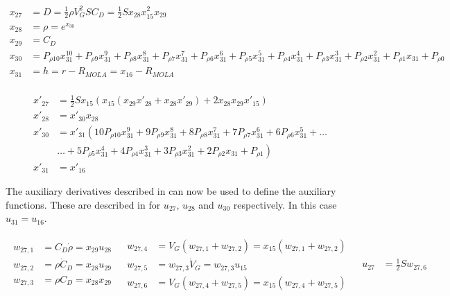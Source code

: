  \begin{equation} \label{eq:dragAux}
\begin{split}
x_{27} &= D = \frac{1}{2}\rho V_{G}^{2}SC_{D} = \frac{1}{2}Sx_{28}x_{15}^{2}x_{29}\\
x_{28} &= \rho = e^{x_{30}} \\
x_{29} &= C_{D} \\
x_{30} &= P_{\rho 10}x_{31}^{10}+P_{\rho 9}x_{31}^{9}+P_{\rho 8}x_{31}^{8}+P_{\rho 7}x_{31}^{7}+P_{\rho 6}x_{31}^{6}+P_{\rho 5}x_{31}^{5}+P_{\rho 4}x_{31}^{4}+P_{\rho 3}x_{31}^{3}+P_{\rho 2}x_{31}^{2}+P_{\rho 1}x_{31}+P_{\rho 0} \\
x_{31} &= h = r-R_{MOLA} = x_{16}-R_{MOLA} \\
\end{split}
\end{equation}

 \begin{equation} \label{eq:dragDerAux}
\begin{split}
x'_{27} &= \frac{1}{2}Sx_{15}\left(x_{15} \left(x_{29}x'_{28}+x_{28}x'_{29}\right)+2x_{28}x_{29}x'_{15}\right) \\
x'_{28} &= x'_{30}x_{28} \\
x'_{30} &=x'_{31} \left(10 P_{\rho 10}x_{31}^{9}+9 P_{\rho 9}x_{31}^{8}+8 P_{\rho 8}x_{31}^{7}+7 P_{\rho 7}x_{31}^{6}+6 P_{\rho 6}x_{31}^{5}+\dots \right. \\
&  \left. \dotsc +5 P_{\rho 5}x_{31}^{4}+4 P_{\rho 4}x_{31}^{3}+3 P_{\rho 3}x_{31}^{2}+2 P_{\rho 2}x_{31}+P_{\rho 1}\right) \\
x'_{31} &= x'_{16}
\end{split}
\end{equation}

\noindent
The auxiliary derivatives described in  can now be used to define the auxiliary functions. These are described in  for $u_{27}$, $u_{28}$ and $u_{30}$ respectively. In this case $u_{31}=u_{16}$.

\begin{align} \label{eq:u27}
\begin{split}
w_{27,1} &= C_{D}\dot{\rho} = x_{29}u_{28} \\
w_{27,2} &= \rho \dot{C}_{D} = x_{28}u_{29} \\
w_{27,3} &= \rho C_{D} = x_{28}x_{29} \\
\end{split}
&
\begin{split}
w_{27,4} &= V_{G}\left(w_{27,1}+w_{27,2}\right) = x_{15}\left(w_{27,1}+w_{27,2}\right) \\
w_{27,5} &= w_{27,3}\dot{V}_{G} = w_{27,3}u_{15} \\
w_{27,6} &= V_{G}\left(w_{27,4}+w_{27,5}\right) = x_{15}\left(w_{27,4}+w_{27,5}\right) \\
\end{split}
&
\begin{split}
u_{27} &= \frac{1}{2} S w_{27,6}\\
\end{split}
\end{align}

